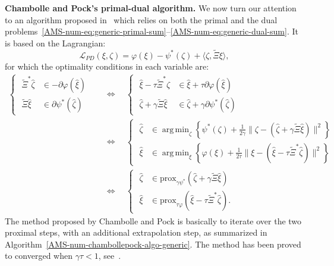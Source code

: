 \documentclass{amsproc}
\theoremstyle{definition}
\theoremstyle{remark}
\numberwithin{equation}{section}
\newcommand{\cL}{{\mathcal L}}
\DeclareMathOperator*{\argmin}{arg\,min}
\newcommand{\prox}{\mathrm{prox}}
\begin{document}
\textbf{Chambolle and Pock's primal-dual algorithm.} We now turn our attention to an algorithm proposed in~\cite{MR2782122} which relies on both the primal and the dual problems~\eqref{AMS-num-eq:generic-primal-sum}--\eqref{AMS-num-eq:generic-dual-sum}. It is based on the Lagrangian:
\begin{equation}
\label{AMS-num-eq:generic-LagSaddlePoint-PD}
	\cL_{PD} (\xi, \zeta) = \varphi(\xi) - \psi^*(\zeta) + \langle \zeta, \widetilde{\Xi} \xi \rangle,
\end{equation}
for which the optimality conditions in each variable are:
\begin{align*}
	\begin{cases}
	\,\, \widetilde{\Xi}^*\hat\zeta &\in -\partial \varphi(\hat\xi) 
	\\
	\,\,  \widetilde{\Xi}\hat\xi &\in \partial \psi^*(\hat \zeta)
	\end{cases}
	&\quad
	\Leftrightarrow
	\quad
	\begin{cases}
	\,\, \hat\xi - \tau \widetilde{\Xi}^*\hat\zeta &\in \hat\xi + \tau \partial \varphi(\hat\xi) 
	\\
	\,\, \hat\zeta + \gamma \widetilde{\Xi}\hat\xi &\in \hat\zeta + \gamma \partial \psi^*(\hat \zeta)
	\end{cases}
	\\
	&\quad
	\Leftrightarrow
	\quad
	\begin{cases}
	\,\, \hat \zeta &\in \argmin_\zeta \left\{ \psi^*(\zeta) + \frac{1}{2 \gamma}\| \zeta - (\hat \zeta + \gamma \widetilde{\Xi} \hat \xi )\|^2 \right\}
	\\
	\,\, \hat \xi &\in \argmin_\xi \left\{ \varphi(\xi) + \frac{1}{2 \tau} \| \xi - (\hat \xi - \tau \widetilde{\Xi}^* \hat \zeta) \|^2 \right\}
	\end{cases}
	\\
	&\quad
	\Leftrightarrow
	\quad
	\begin{cases}
	\,\, \hat \zeta &\in \prox_{\gamma \psi^*} (\hat \zeta + \gamma \widetilde{\Xi} \hat \xi ) 
	\\
	\,\, \hat \xi &\in \prox_{\tau \varphi} (\hat \xi - \tau \widetilde{\Xi}^* \hat \zeta).
	\end{cases}
\end{align*}
The method proposed by Chambolle and Pock is basically to iterate over the two proximal steps, with an additional extrapolation step, as summarized in Algorithm~\ref{AMS-num-chambollepock-algo-generic}. The method has been proved to converged when $\gamma \tau < 1$, see~\cite{MR2782122}.
\end{document}
